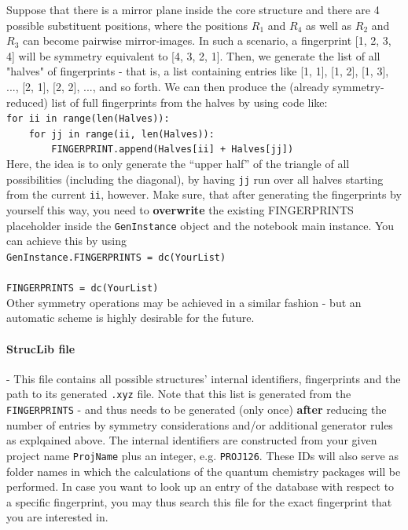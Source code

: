 \documentclass[12pt]{achemso}
\begin{document}
\noindent Suppose that there is a mirror plane inside the core structure and there are 4 possible substituent positions, where the positions $R_1$ and $R_4$ as well as $R_2$ and $R_3$ can become pairwise mirror-images. In such a scenario, a fingerprint [1, 2, 3, 4] will be symmetry equivalent to [4, 3, 2, 1]. Then, we generate the list of all "halves" of fingerprints - that is, a list containing entries like [1, 1],\linebreak \phantom{} [1, 2], [1, 3], ..., [2, 1], [2, 2], ..., and so forth. We can then produce the (already symmetry-reduced) list of full fingerprints from the halves by using code like:\\[-1.5em]

\verb+for ii in range(len(Halves)):+\\
\verb+    for jj in range(ii, len(Halves)):+\\
\verb-        FINGERPRINT.append(Halves[ii] + Halves[jj])-\\[-1.5em]

\noindent Here, the idea is to only generate the ``upper half'' of the triangle of all possibilities (including the diagonal), by having \texttt{jj} run over all halves starting from the current \texttt{ii}, however. Make sure, that after generating the fingerprints by yourself this way, you need to \textbf{overwrite} the existing FINGERPRINTS placeholder inside the \texttt{GenInstance} object and the notebook main instance. You can achieve this by using\\[1.0em]

\verb|GenInstance.FINGERPRINTS = dc(YourList)|\\

\phantom{}\\[-10.0em]

\verb|FINGERPRINTS = dc(YourList)|\\[1em]

\noindent Other symmetry operations may be achieved in a similar fashion - but an automatic scheme is highly desirable for the future.

\paragraph{StrucLib file} - This file contains all possible structures' internal identifiers, fingerprints and the path to its generated \texttt{.xyz} file. Note that this list is generated from the \texttt{FINGERPRINTS} - and thus needs to be generated (only once) \textbf{after} reducing the number of entries by symmetry considerations and/or additional generator rules as explqained above. The internal identifiers are constructed from your given project name \texttt{ProjName} plus an integer, e.g. \texttt{PROJ126}. These IDs will also serve as folder names in which the calculations of the quantum chemistry packages will be performed. In case you want to look up an entry of the database with respect to a specific fingerprint, you may thus search this file for the exact fingerprint that you are interested in.
\end{document}
